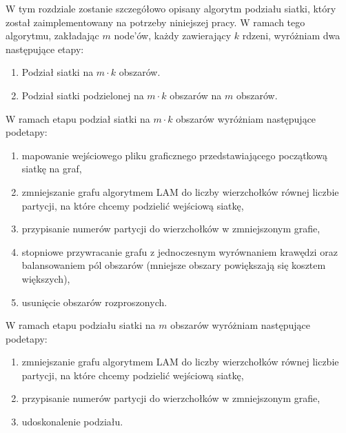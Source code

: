 W tym rozdziale zostanie szczegółowo opisany algorytm podziału siatki, który został zaimplementowany na potrzeby
niniejszej pracy.
W ramach tego algorytmu, zakładając $m$ node'ów, każdy zawierający $k$ rdzeni, wyróżniam dwa następujące etapy:

\begin{enumerate}
    \item Podział siatki na $m \cdot k$ obszarów.
    \item Podział siatki podzielonej na $m \cdot k$ obszarów na $m$ obszarów.
\end{enumerate}

W ramach etapu podział siatki na $m \cdot k$ obszarów wyróżniam następujące podetapy:
        {\begin{enumerate}
             \item {mapowanie wejściowego pliku graficznego przedstawiającego początkową siatkę na graf,}
             \item {zmniejszanie grafu algorytmem LAM \cite{weighted_maching} do liczby wierzchołków równej liczbie partycji,
                 na które chcemy podzielić wejściową siatkę,}
             \item {przypisanie numerów partycji do wierzchołków w zmniejszonym grafie,}
             \item {stopniowe przywracanie grafu z jednoczesnym wyrównaniem krawędzi \cite{10.1007/3-540-44842-X_6} oraz balansowaniem pól obszarów (mniejsze
             obszary powiększają się kosztem większych),}
             \item {usunięcie obszarów rozproszonych.}
\end{enumerate}}

W ramach etapu podziału siatki na $m$ obszarów wyróżniam następujące podetapy:
\begin{enumerate}
    \item {zmniejszanie grafu algorytmem LAM \cite{weighted_maching} do liczby wierzchołków równej liczbie partycji,
        na które chcemy podzielić wejściową siatkę,}
    \item {przypisanie numerów partycji do wierzchołków w zmniejszonym grafie,}
    \item {udoskonalenie podziału.}
\end{enumerate}